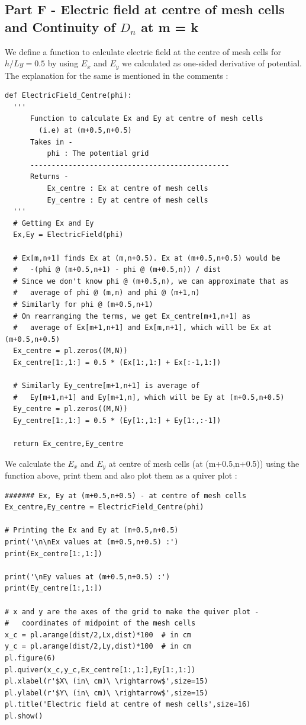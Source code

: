 \documentclass[11pt, a4paper]{article}
\begin{document}
\subsection{Part F - Electric field at centre of mesh cells and Continuity of $D_n$ at m = k}
We define a function to calculate electric field at the centre of mesh cells for $h/Ly = 0.5$ by using $E_x$ and $E_y$ we calculated as one-sided derivative of potential.
The explanation for the same is mentioned in the comments :
\begin{verbatim}
def ElectricField_Centre(phi):
  '''
      Function to calculate Ex and Ey at centre of mesh cells 
        (i.e) at (m+0.5,n+0.5)
      Takes in -
          phi : The potential grid
      -----------------------------------------------
      Returns -
          Ex_centre : Ex at centre of mesh cells
          Ey_centre : Ey at centre of mesh cells
  '''
  # Getting Ex and Ey
  Ex,Ey = ElectricField(phi)

  # Ex[m,n+1] finds Ex at (m,n+0.5). Ex at (m+0.5,n+0.5) would be 
  #   -(phi @ (m+0.5,n+1) - phi @ (m+0.5,n)) / dist
  # Since we don't know phi @ (m+0.5,n), we can approximate that as 
  #   average of phi @ (m,n) and phi @ (m+1,n)
  # Similarly for phi @ (m+0.5,n+1)
  # On rearranging the terms, we get Ex_centre[m+1,n+1] as 
  #   average of Ex[m+1,n+1] and Ex[m,n+1], which will be Ex at (m+0.5,n+0.5)
  Ex_centre = pl.zeros((M,N))
  Ex_centre[1:,1:] = 0.5 * (Ex[1:,1:] + Ex[:-1,1:])

  # Similarly Ey_centre[m+1,n+1] is average of 
  #   Ey[m+1,n+1] and Ey[m+1,n], which will be Ey at (m+0.5,n+0.5)
  Ey_centre = pl.zeros((M,N))
  Ey_centre[1:,1:] = 0.5 * (Ey[1:,1:] + Ey[1:,:-1])

  return Ex_centre,Ey_centre
\end{verbatim}
We calculate the $E_x$ and $E_y$ at centre of mesh cells (at (m+0.5,n+0.5)) using the function above, print them and also plot them as a quiver plot :
\begin{verbatim}
####### Ex, Ey at (m+0.5,n+0.5) - at centre of mesh cells
Ex_centre,Ey_centre = ElectricField_Centre(phi)

# Printing the Ex and Ey at (m+0.5,n+0.5)
print('\n\nEx values at (m+0.5,n+0.5) :')
print(Ex_centre[1:,1:])

print('\nEy values at (m+0.5,n+0.5) :')
print(Ey_centre[1:,1:])

# x and y are the axes of the grid to make the quiver plot - 
#   coordinates of midpoint of the mesh cells
x_c = pl.arange(dist/2,Lx,dist)*100  # in cm
y_c = pl.arange(dist/2,Ly,dist)*100  # in cm
pl.figure(6)
pl.quiver(x_c,y_c,Ex_centre[1:,1:],Ey[1:,1:])
pl.xlabel(r'$X\ (in\ cm)\ \rightarrow$',size=15)
pl.ylabel(r'$Y\ (in\ cm)\ \rightarrow$',size=15)
pl.title('Electric field at centre of mesh cells',size=16)
pl.show()
\end{verbatim}
\end{document}
